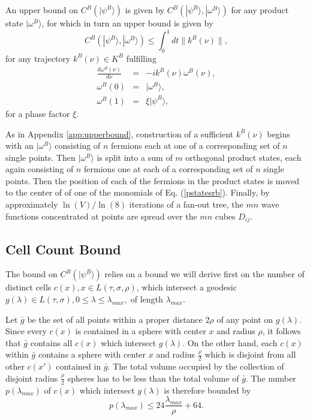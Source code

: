 \documentclass[twocolumn,amsmath,amssymb]{revtex4-1}
\begin{document}
An upper bound on $C^B( |\psi^B \rangle )$ 
is given by $C^B( |\psi^B \rangle , |\omega^B \rangle )$ for any product state
$|\omega^B \rangle $, for which in turn an upper bound is given by 
\begin{equation}
\label{cpsiomega1}
C^B( |\psi^B \rangle , |\omega^B \rangle ) \le \int_0^1 d t \parallel k^B( \nu) \parallel,
\end{equation} 
for any 
trajectory $k^B(\nu) \in K^B$ fulfilling
\begin{subequations}
\begin{eqnarray}
\label{udot1}
\frac{d\omega^B(\nu)}{d \nu} & = &-i k^B( \nu) \omega^B( \nu), \\
\label{uboundary1}
\omega^B( 0) & = & |\omega^B \rangle , \\
\label{uboundary2}
\omega^B( 1) & = & \xi |\psi^B \rangle ,
\end{eqnarray}
\end{subequations}
for a phase factor $\xi$.

As in Appendix \ref{app:upperbound}, construction of a
sufficient $k^B(\nu)$ 
begins with an $|\omega^B \rangle $
consisting of $n$ fermions each at one of a corresponding set of
$n$ single points.
Then $|\omega^B \rangle $
is split into a sum of $m$ orthogonal product states, each again consisting
of $n$ fermions one at each of a corresponding set of $n$ single points. Then the 
position of each of the fermions in the product states is moved to the center of
of one of the monomials of Eq. (\ref{pstatesrb}). 
Finally, by approximately $\ln( V) / \ln( 8)$ iterations of a
fan-out tree, the $m n$ wave functions concentrated at points are spread over the 
$m n$ cubes $D_{ij}$.

\subsection{\label{app:subsecpath} Cell Count Bound}

The bound on $C^B( |\psi^B \rangle )$ relies on a bound we
will derive first on the number  of
distinct cells $c(x), x \in L( \tau, \sigma, \rho)$,
which intersect a geodesic
 $ g( \lambda) \in L( \tau, \sigma), 0 \le \lambda \le \lambda_{max},$
of length $\lambda_{max}$.

Let $\bar{g}$ be the set of all points
within a proper distance $2 \rho$ of any point on $g(\lambda)$.
Since every $c(x)$ is contained in
a sphere with center $x$ and radius $\rho$, it follows that
$\bar{g}$ contains all $c(x)$ which intersect $g(\lambda)$.
On the other hand, each $c(x)$ within $\bar{g}$ contains a sphere with center $x$
and radius $\frac{\rho}{2}$ which is disjoint from all other $c(x')$ contained
in $\bar{g}$. The total volume occupied by the collection of disjoint
radius $\frac{\rho}{2}$ spheres has to be less than the total volume of $\bar{g}$.
The number $p(\lambda_{max})$ of $c(x)$ which intersect $g(\lambda)$  
is therefore bounded by
\begin{equation}
  \label{nubound}
  p( \lambda_{max}) \le 24 \frac{ \lambda_{max}}{\rho} + 64.
\end{equation}
\end{document}
